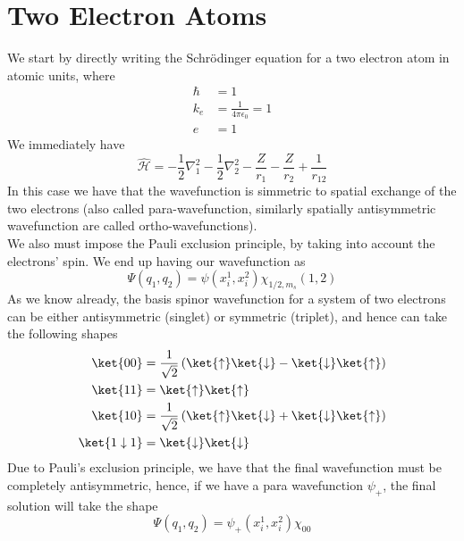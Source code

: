 \documentclass[a4paper, 11pt]{book}
\newcommand{\1}{\opr{\mathds{1}}}
\newcommand{\ham}{\mathcal{H}}
\newcommand{\opr}[1]{\hat{#1}}
\newcommand{\up}{\uparrow}
\newcommand{\down}{\downarrow}
\theoremstyle{plain}
\begin{document}
	\chapter{Two Electron Atoms}
	We start by directly writing the Schrödinger equation for a two electron atom in atomic units, where
	\begin{equation*}
		\begin{aligned}
			\hbar&=1\\
			k_e&=\frac{1}{4\pi\epsilon_0}=1\\
			e&=1
		\end{aligned}
	\end{equation*}
	We immediately have
	\begin{equation}
		\opr{\ham}=-\frac{1}{2}\nabla_1^2-\frac{1}{2}\nabla_2^2-\frac{Z}{r_1}-\frac{Z}{r_2}+\frac{1}{r_{12}}
		\label{eq:twoelectronham}
	\end{equation}
	In this case we have that the wavefunction is simmetric to spatial exchange of the two electrons (also called para-wavefunction, similarly spatially antisymmetric wavefunction are called ortho-wavefunctions).\\
	We also must impose the Pauli exclusion principle, by taking into account the electrons' spin. We end up having our wavefunction as
	\begin{equation}
		\Psi(q_1,q_2)=\psi(x_i^1,x_i^2)\chi_{1/2,m_s}(1,2)
		\label{eq:wavefunctiontwoeminus}
	\end{equation}
	As we know already, the basis spinor wavefunction for a system of two electrons can be either antisymmetric (singlet) or symmetric (triplet), and hence can take the following shapes
	\begin{equation*}
		\begin{aligned}
			\ket{00}&=\frac{1}{\sqrt{2}}\left( \ket{\up}\ket{\down}-\ket{\down}\ket{\up} \right)\\
			\ket{11}&=\ket{\up}\ket{\up}\\
			\ket{10}&=\frac{1}{\sqrt{2}}\left( \ket{\up}\ket{\down}+\ket{\down}\ket{\up} \right)\\
			\ket{1\down1}&=\ket{\down}\ket{\down}
		\end{aligned}
	\end{equation*}
	Due to Pauli's exclusion principle, we have that the final wavefunction must be completely antisymmetric, hence, if we have a para wavefunction $\psi_+$, the final solution will take the shape
	\begin{equation}
		\Psi(q_1,q_2)=\psi_+(x_i^1,x_i^2)\chi_{00}
		\label{eq:parawave}
	\end{equation}
\end{document}
